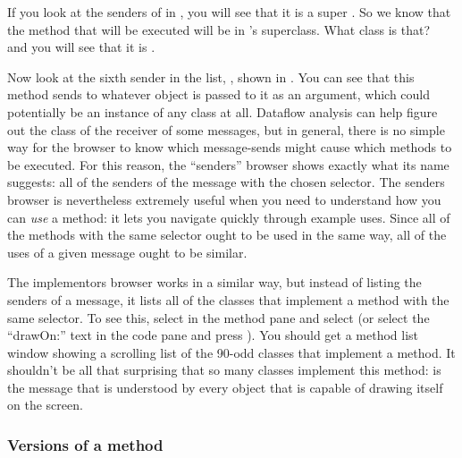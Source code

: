 \documentclass[a4paper,10pt,twoside]{book}
\begin{document}
If you look at the senders of  in , you will see that it is a super .  So we know that the method that will be executed will be in 's superclass.  What class is that?  \Actclick ~  and you will see that it is . 

Now look at the sixth sender in the list, , shown in .
You can see that this method sends  to whatever object is passed to it as an argument, which could potentially be an instance of any class at all.  
Dataflow analysis can help figure out the class of the receiver of some messages, but in general, there is no simple way for the browser to know which message-sends might cause which methods to be executed.
For this reason,  the ``senders'' browser shows exactly what its name suggests: all of the senders of the message with the chosen selector.  
The senders browser is nevertheless extremely useful when you need to understand how you can \emph{use} a method: it lets you navigate quickly through example uses.  
Since all of the methods with the same selector ought to be used in the same way, all of the uses of a given message ought to be similar.

The implementors browser works in a similar way, but instead of listing the senders of a message, it lists all of the classes that implement a method with the same selector. To see this, select  in the method pane and select  (or select the ``drawOn:'' text in the code pane and press ).
You should get a method list window showing a scrolling list of the 90-odd classes that implement a  method.
It shouldn't be all that surprising that so many classes implement this method:  is the message that is understood by every object that is capable of drawing itself on the screen.

\subsubsection{Versions of a method}
\end{document}
